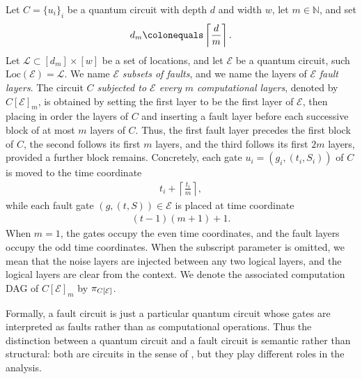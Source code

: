 \begin{definition}
  Let $C=\{u_i\}_i$ be a quantum circuit with depth $d$ and width $w$, let $m\in\mathbb{N}$, and set
  \begin{equation*}
    \begin{split}
      d_m \colonequals \left\lceil \frac{d}{m} \right\rceil.
    \end{split}
  \end{equation*}
  Let $\mathcal{L}\subset [d_m]\times [w]$ be a set of locations, and let $\mathcal{E}$ be a quantum circuit, such $\text{Loc}(\mathcal{E}) = \mathcal{L}$. We name $\mathcal{E}$ \textit{subsets of faults}, and we name the layers of $\mathcal{E}$ \textit{fault layers}.
  The circuit \textit{$C$ subjected to $\mathcal{E}$ every $m$ computational layers}, denoted by $C[\mathcal{E}]_{m}$, is obtained by setting the first layer to be the first layer of $\mathcal{E}$, then placing in order the layers of $C$ and inserting a fault layer before each successive block of at most $m$ layers of $C$. Thus, the first fault layer precedes the first block of $C$, the second follows its first $m$ layers, and the third follows its first $2m$ layers, provided a further block remains. Concretely, each gate $u_i=(g_i,(t_i,S_i))$ of $C$ is moved to the time coordinate
  \begin{equation*}
    \begin{split}
      t_i + \left\lceil \frac{t_i}{m} \right\rceil,
    \end{split}
  \end{equation*}
  while each fault gate $(g,(t,S))\in\mathcal{E}$ is placed at time coordinate
  \begin{equation*}
    \begin{split}
      (t-1)(m+1)+1.
    \end{split}
  \end{equation*}
When $m=1$, the gates occupy the even time coordinates, and the fault layers occupy the odd time coordinates. When the subscript parameter is omitted, we mean that the noise layers are injected between any two logical layers, and the logical layers are clear from the context. We denote the associated computation DAG of $C[\mathcal{E}]_{m}$ by $\pi_{C[\mathcal{E}]}$.
\end{definition}



\begin{remark}
  Formally, a fault circuit is just a particular quantum circuit whose gates are interpreted as faults rather than as computational operations. Thus the distinction between a quantum circuit and a fault circuit is semantic rather than structural: both are circuits in the sense of , but they play different roles in the analysis.
\end{remark}

